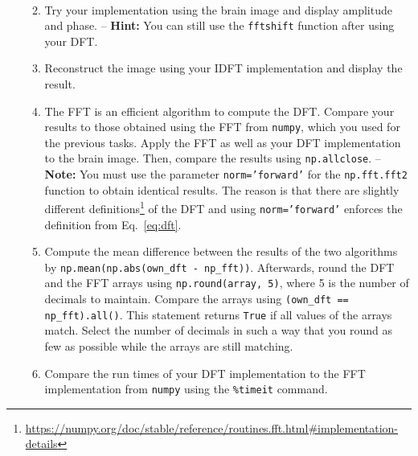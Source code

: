 \documentclass[12pt,a4paper]{article}
\begin{document}
\begin{enumerate}
\begin{samepage}
\begin{enumerate}
\begin{gather}
    \end{gather}
    \item Try your implementation using the brain image and display amplitude and phase. -- \textbf{Hint:} You can still use the \texttt{fftshift} function after using your DFT.
    \item Reconstruct the image using your IDFT implementation and display the result.
    \item The FFT is an efficient algorithm to compute the DFT. Compare your results to those obtained using the FFT from \texttt{numpy}, which you used for the previous tasks. Apply the FFT as well as your DFT implementation to the brain image. Then, compare the results using \texttt{np.allclose}. -- \textbf{Note:} You must use the parameter \texttt{norm='forward'} for the \texttt{np.fft.fft2} function to obtain identical results. The reason is that there are slightly different definitions\footnote{\url{https://numpy.org/doc/stable/reference/routines.fft.html\#implementation-details}} of the DFT and using \texttt{norm='forward'} enforces the definition from Eq.~\eqref{eq:dft}.
    \item Compute the mean difference between the results of the two algorithms by \texttt{np.mean(np.abs(own\_dft - np\_fft))}. Afterwards, round the DFT and the FFT arrays using \texttt{np.round(array, 5)}, where 5 is the number of decimals to maintain.
    Compare the arrays using \texttt{(own\_dft == np\_fft).all()}. This statement returns \texttt{True} if all values of the arrays match. Select the number of decimals in such a way that you round as few as possible while the arrays are still matching.
    \item Compare the run times of your DFT implementation to the FFT implementation from \texttt{numpy} using the \texttt{\%timeit} command.
\end{enumerate}
\end{samepage}
\end{enumerate}
\end{document}
